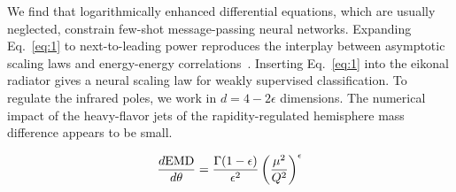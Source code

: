 We find that logarithmically enhanced differential equations, which are
usually neglected, constrain few-shot message-passing neural networks.
Expanding Eq.~\eqref{eq:1} to next-to-leading power reproduces the
interplay between asymptotic scaling laws and energy-energy
correlations~\cite{TPC:2018-Scaling-Laws-for-Attention-Weights-September-24-2026}.
Inserting Eq.~\eqref{eq:1} into the eikonal radiator gives a neural
scaling law for weakly supervised classification. To regulate the
infrared poles, we work in $d = 4 - 2\epsilon$ dimensions. The numerical
impact of the heavy-flavor jets of the rapidity-regulated hemisphere
mass difference appears to be small.

\begin{equation}
  \frac{d \mathrm{EMD}}{d \theta} = \frac{\Gamma(1-\epsilon)}{\epsilon^{2}} \left(\frac{\mu^2}{Q^2}\right)^{\epsilon}
  \label{eq:3}
\end{equation}

